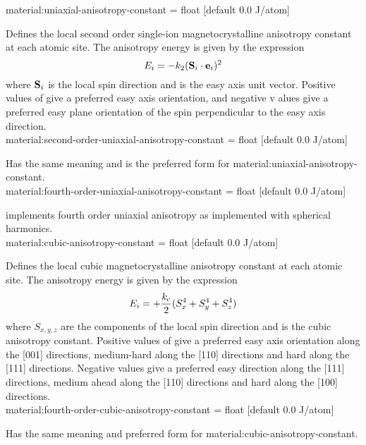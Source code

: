 {\zicf material:uniaxial-anisotropy-constant = float [default 0.0 J/atom]}
  Defines the local second order single-ion magnetocrystalline anisotropy
  constant at each atomic site. The anisotropy energy is given by the expression
\begin{equation*}
E_i = -k_{2} (\mathbf{S}_i \cdot \mathbf{e}_i)^2
\end{equation*}
where $\mathbf{S}_i$ is the local spin direction and \ei is the easy axis unit vector.
Positive values of \kuu give a preferred easy axis orientation, and negative v
alues give a preferred easy plane orientation of the spin perpendicular to the
easy axis direction.\\

{\zicf material:second-order-uniaxial-anisotropy-constant = float [default 0.0 J/atom]}
Has the same meaning and is the preferred form for material:uniaxial-anisotropy-constant.\\

{\zicf material:fourth-order-uniaxial-anisotropy-constant = float [default 0.0 J/atom]}
implements fourth order uniaxial anisotropy as implemented with spherical
harmonics.\\

{\zicf material:cubic-anisotropy-constant = float [default 0.0 J/atom]}
Defines the local cubic magnetocrystalline anisotropy constant at each atomic site. The anisotropy energy is given by the expression
\begin{equation*}
E_i = +\frac{k_{\mathrm{c}}}{2} (S_x^4 + S_y^4 + S_z^4)
\end{equation*}
where $S_{x,y,z}$ are the components of the local spin direction and \kc is
the cubic anisotropy constant. Positive values of \kc give a preferred easy
axis orientation along the [001] directions, medium-hard along the [110]
directions and hard along the [111] directions. Negative values give a preferred
easy direction along the [111] directions, medium ahead along the [110]
directions and hard along the [100] directions. \\

{\zicf material:fourth-order-cubic-anisotropy-constant = float [default 0.0 J/atom]}
Has the same meaning and preferred form for material:cubic-anisotropy-constant.

